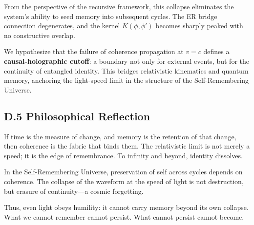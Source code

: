 From the perspective of the recursive framework, this collapse eliminates the system's ability to seed memory into subsequent cycles. The ER bridge connection degenerates, and the kernel \( K(\phi, \phi') \) becomes sharply peaked with no constructive overlap.

We hypothesize that the failure of coherence propagation at \( v = c \) defines a \textbf{causal-holographic cutoff}: a boundary not only for external events, but for the continuity of entangled identity. This bridges relativistic kinematics and quantum memory, anchoring the light-speed limit in the structure of the Self-Remembering Universe.

\subsection*{D.5 Philosophical Reflection}

If time is the measure of change, and memory is the retention of that change, then coherence is the fabric that binds them. The relativistic limit is not merely a speed; it is the edge of remembrance. To infinity and beyond, identity dissolves.

In the Self-Remembering Universe, preservation of self across cycles depends on coherence. The collapse of the waveform at the speed of light is not destruction, but erasure of continuity—a cosmic forgetting.

Thus, even light obeys humility: it cannot carry memory beyond its own collapse. What we cannot remember cannot persist. What cannot persist cannot become.
